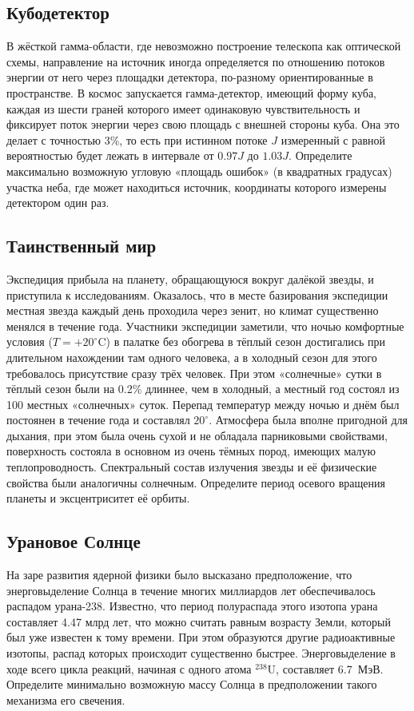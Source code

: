 \documentclass[12pt]{article}
\begin{document}
\subsection{Кубодетектор}
В жёсткой гамма-области, где невозможно построение телескопа как оптической схемы,
направление на источник иногда определяется по отношению потоков энергии от него
через площадки детектора, по-разному ориентированные в пространстве. В космос
запускается гамма-детектор, имеющий форму куба, каждая из шести граней которого
имеет одинаковую чувствительность и фиксирует поток энергии через свою площадь с
внешней стороны куба. Она это делает с точностью 3\%, то есть при истинном потоке
$J$ измеренный с равной вероятностью будет лежать в интервале от $0.97J$ до $1.03J$.
Определите максимально возможную угловую «площадь ошибок» (в квадратных градусах)
участка неба, где может находиться источник, координаты которого измерены детектором
один раз.

\subsection{Таинственный мир}
Экспедиция прибыла на планету, обращающуюся вокруг далёкой звезды, и приступила к
исследованиям. Оказалось, что в месте базирования экспедиции местная звезда каждый
день проходила через зенит, но климат существенно менялся в течение года. Участники
экспедиции заметили, что ночью комфортные условия ($T=+20^\circ$C) в палатке без
обогрева в тёплый сезон достигались при длительном нахождении там одного человека, а
в холодный сезон для этого требовалось присутствие сразу трёх человек. При этом
«солнечные» сутки в тёплый сезон были на 0.2\% длиннее, чем в холодный, а местный год
состоял из 100 местных «солнечных» суток. Перепад температур между ночью и днём был
постоянен в течение года и составлял $20^\circ$. Атмосфера была вполне пригодной для
дыхания, при этом была очень сухой и не обладала парниковыми свойствами, поверхность
состояла в основном из очень тёмных пород, имеющих малую теплопроводность.
Спектральный состав излучения звезды и её физические свойства были аналогичны
солнечным. Определите период осевого вращения планеты и эксцентриситет её орбиты.

\subsection{Урановое Солнце}
На заре развития ядерной физики было высказано предположение, что энерговыделение
Солнца в течение многих миллиардов лет обеспечивалось распадом урана-238. Известно,
что период полураспада этого изотопа урана составляет 4.47 млрд лет, что можно
считать равным возрасту Земли, который был уже известен к тому времени. При этом
образуются другие радиоактивные изотопы, распад которых происходит существенно
быстрее. Энерговыделение в ходе всего цикла реакций, начиная с одного атома
$^{238}$U, составляет 6.7~МэВ. Определите минимально возможную массу Солнца в
предположении такого механизма его свечения.
\end{document}
